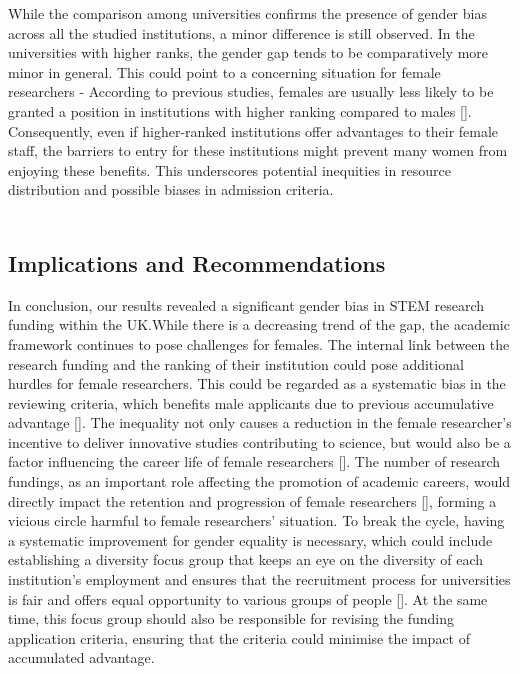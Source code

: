 While the comparison among universities confirms the presence of gender bias across all the studied institutions, a minor difference is still observed. In the universities with higher ranks, the gender gap tends to be comparatively more minor in general. This could point to a concerning situation for female researchers - According to previous studies, females are usually less likely to be granted a position in institutions with higher ranking compared to males [\cite{gender_science}]. Consequently, even if higher-ranked institutions offer advantages to their female staff, the barriers to entry for these institutions might prevent many women from enjoying these benefits. This underscores potential inequities in resource distribution and possible biases in admission criteria.\\
\\
\subsection{Implications and Recommendations}

In conclusion, our results revealed a significant gender bias in STEM research funding within the UK.While there is a decreasing trend of the gap, the academic framework continues to pose challenges for females. The internal link between the research funding and the ranking of their institution could pose additional hurdles for female researchers. This could be regarded as a systematic bias in the reviewing criteria, which benefits male applicants due to previous accumulative advantage [\cite{Holly2019}]. The inequality not only causes a reduction in the female researcher's incentive to deliver innovative studies contributing to science, but would also be a factor influencing the career life of female researchers [\cite{jebsen2022dismantling}]. The number of research fundings, as an important role affecting the promotion of academic careers, would directly impact the retention and progression of female researchers [\cite{jebsen2022dismantling}], forming a vicious circle harmful to female researchers' situation. To break the cycle, having a systematic improvement for gender equality is necessary, which could include establishing a diversity focus group that keeps an eye on the diversity of each institution's employment and ensures that the recruitment process for universities is fair and offers equal opportunity to various groups of people [\cite{sardelis2017ten}]. At the same time, this focus group should also be responsible for revising the funding application criteria, ensuring that the criteria could minimise the impact of accumulated advantage. \\
